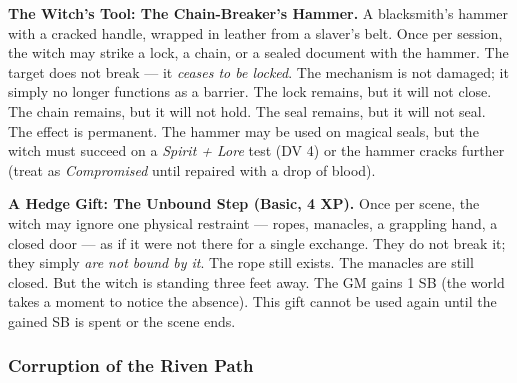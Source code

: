 \textbf{The Witch's Tool: The Chain-Breaker's Hammer.} A blacksmith's hammer with a cracked handle, wrapped in leather from a slaver's belt. Once per session, the witch may strike a lock, a chain, or a sealed document with the hammer. The target does not break --- it \textit{ceases to be locked}. The mechanism is not damaged; it simply no longer functions as a barrier. The lock remains, but it will not close. The chain remains, but it will not hold. The seal remains, but it will not seal. The effect is permanent. The hammer may be used on magical seals, but the witch must succeed on a \textit{Spirit + Lore} test (DV 4) or the hammer cracks further (treat as \textit{Compromised} until repaired with a drop of blood).

\textbf{A Hedge Gift: The Unbound Step (Basic, 4 XP).} Once per scene, the witch may ignore one physical restraint --- ropes, manacles, a grappling hand, a closed door --- as if it were not there for a single exchange. They do not break it; they simply \textit{are not bound by it}. The rope still exists. The manacles are still closed. But the witch is standing three feet away. The GM gains 1 SB (the world takes a moment to notice the absence). This gift cannot be used again until the gained SB is spent or the scene ends.

\subsubsection*{Corruption of the Riven Path}


